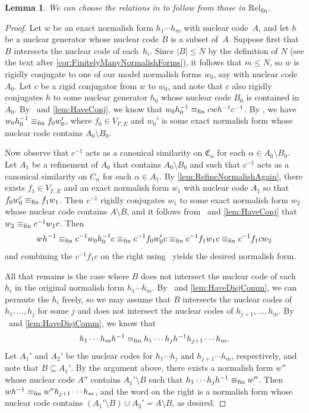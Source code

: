 \documentclass[11pt,letterpaper]{amsart}
\newtheorem{lemma}[theorem]{Lemma}
\theoremstyle{definition}
\newcommand{\Rel}{\mathrm{Rel}}
\newcommand{\C}{\mathfrak{C}}
\begin{document}
\begin{lemma}\label{lem:HaveProd}
We can choose the relations in\/ {\normalfont\Prod} to follow from those in\/ $\Rel_{\mathrm{fin}}$.
\end{lemma}
\begin{proof}
Let $w$ be an exact normalish form  $h_1\cdots h_m$ with nuclear code~$A$, and let $h$ be a nuclear generator whose nuclear code $B$ is a subset of~$A$.  Suppose first that $B$ intersects the nuclear code of each~$h_i$.  Since $|B|\leq N$ by the definition of $N$ (see the text after \cref{cor:FinitelyManyNormalishForms}), it follows that $m\leq N$, so $w$ is rigidly conjugate to one of our model normalish forms $w_0$, say with nuclear code~$A_0$.  Let $c$ be a rigid conjugator from $w$ to $w_0$, and note that $c$ also rigidly conjugates $h$ to some nuclear generator $h_0$ whose nuclear code $B_0$ is contained in~$A_0$.  By \Conj\ and \cref{lem:HaveConj}, we know that $w_0h_0^{-1} \equiv_{\mathrm{fin}} cwh^{-1}c^{-1}$. By \ProdFin, we have $w_0h_0^{-1} \equiv_{\mathrm{fin}} f_0w_0'$, where $f_0\in V_{\Gamma,E}$ and $w_0'$ is some exact normalish form whose nuclear code contains $A_0\setminus B_0$.

Now observe that $c^{-1}$ acts as a canonical similarity on $\C_{\alpha}$ for each $\alpha\in A_0\setminus B_0$.  Let $A_1$ be a refinement of $A_0$ that contains $A_0\setminus B_0$ and such that $c^{-1}$ acts as a canonical similarity on $C_\alpha$ for each $\alpha\in A_1$.  By \cref{lem:RefineNormalishAgain}, there exists $f_1\in V_{\Gamma,E}$ and an exact normalish form $w_1$ with nuclear code $A_1$ so that $f_0w_0'\equiv_{\mathrm{fin}} f_1w_1$.  Then $c^{-1}$ rigidly conjugates $w_1$ to some exact normalish form $w_2$ whose nuclear code contains $A\setminus B$, and it follows from \Conj\ and \cref{lem:HaveConj} that $w_2\equiv_{\mathrm{fin}} c^{-1}w_1c$.  Then
\[
wh^{-1} \equiv_{\mathrm{fin}} c^{-1}w_0h_0^{-1} c \equiv_{\mathrm{fin}} c^{-1}f_0w_0'c \equiv_{\mathrm{fin}} c^{-1}f_1w_1c \equiv_{\mathrm{fin}} c^{-1}f_1cw_2
\]
and combining the $c^{-1}f_1c$ on the right using \VRel\ yields the desired normalish form.

All that remains is the case where $B$ does not intersect the nuclear code of each $h_i$ in the original normalish form $h_1\cdots h_m$.  By \DisjComm\ and \cref{lem:HaveDisjComm}, we can permute the $h_i$ freely, so we may assume that $B$ intersects the nuclear codes of $h_1,\ldots,h_j$ for some $j$ and does not intersect the nuclear codes of $h_{j+1},\ldots,h_m$. By \DisjComm\ and \cref{lem:HaveDisjComm}, we know that
\[
h_1\cdots h_m h^{-1} \equiv_{\mathrm{fin}} h_1\cdots h_j h^{-1} h_{j+1}\cdots h_m.
\]
Let $A_1'$ and $A_2'$ be the nuclear codes for $h_1\cdots h_j$ and $h_{j+1}\cdots h_m$, respectively, and note that $B\subseteq A_1'$. By the argument above, there exists a normalish form $w''$ whose nuclear code $A''$ contains $A_1'\setminus B$ such that $h_1\cdots h_jh^{-1}\equiv_{\mathrm{fin}} w''$. Then $wh^{-1} \equiv_{\mathrm{fin}} w''h_{j+1}\cdots h_m$, and the word on the right is a normalish form whose nuclear code contains $(A_1'\setminus B)\cup A_2' = A\setminus B$, as desired.
\end{proof}
\end{document}
